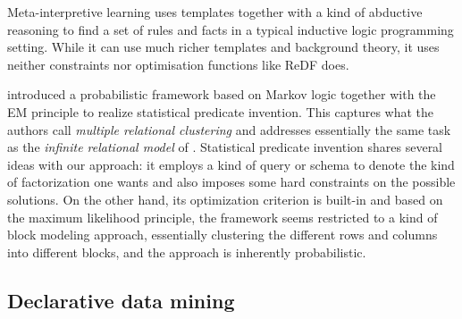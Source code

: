 Meta-interpretive learning \parencite{meta_learning} uses templates together with a kind of abductive reasoning
to find a set of rules and facts in a typical inductive logic programming setting. While it can use much richer templates and 
background theory, it uses neither constraints nor optimisation functions like ReDF does.

\cite{predicateinvention} introduced a probabilistic framework based on Markov logic together with the EM principle to realize statistical predicate invention. This captures what the authors call \textit{multiple relational clustering} and addresses essentially the same task as the \textit{infinite relational model} of \cite{conf/aaai/KempTGYU06}.  Statistical predicate invention shares several ideas with our approach:  it employs a kind of query or schema to denote the kind of factorization one wants and also imposes some hard constraints on the possible solutions. On the other hand, its optimization criterion is built-in and based on the maximum likelihood principle, the framework seems restricted to a kind of block modeling approach, essentially clustering the different rows and columns into different blocks, and the approach is inherently probabilistic.  %


\subsection{Declarative data mining} 




